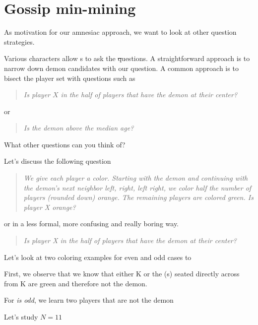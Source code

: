 
\section{Gossip min-mining}\label{sec:questions}
As motivation for our amnesiac approach, we want to look at other question strategies.

Various characters allow \player{}s to ask the \st questions.
A straightforward approach is to narrow down demon candidates with our question.
A common approach is to bisect the player set \playerset with questions such as

\begin{quote}
    \itshape
    Is player $X$ in the half of players that have the demon at their center?
\end{quote}
or
\begin{quote}
    \itshape
    Is the demon above the median age?
\end{quote}

What other questions can you think of?

\begin{question}\label{q:gossip-search}
    Let's discuss the following question
    \begin{quote}
        \itshape
        We give each player a color.
        Starting with the demon and continuing with the demon's next neighbor
        left, right, left right,
        we color half the number of players (rounded down) orange.
        The remaining players are colored green.
        Is player X orange?
    \end{quote}
    or in a less formal, more confusing and really boring way.
    \begin{quote}
        \itshape
        Is player X in the half of players that have the demon at their center?
    \end{quote}
\end{question}

\begin{observation}
    Let's look at two coloring examples for even and odd cases to
    
    

    First, we observe that we know that either K
    or the \player(s) seated directly across from K are green and therefore not the demon.

    For \emph{\playercount is odd}, we learn two players that are not the demon

    Let's study $N=11$
\end{observation}

